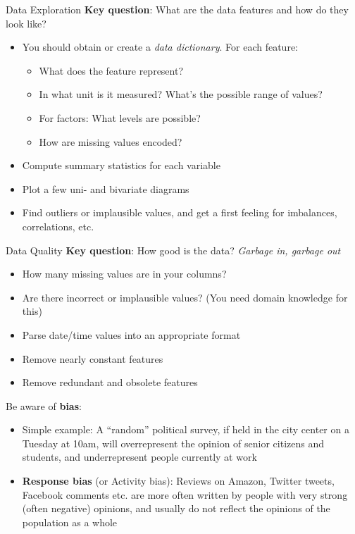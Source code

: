 \documentclass[ignorenonframetext,]{beamer}
\providecommand{\tightlist}{%
  \setlength{\itemsep}{0pt}\setlength{\parskip}{0pt}}
\begin{document}
\begin{frame}{Data Exploration}
\label{data-exploration}
\textbf{Key question}: What are the data features and how do they look like?
\begin{itemize}
\tightlist
\item
  You should obtain or create a \emph{data dictionary}. For each
  feature:

  \begin{itemize}
  \tightlist
  \item
    What does the feature represent?
  \item
    In what unit is it measured? What's the possible range of values?
  \item
    For factors: What levels are possible?
  \item
    How are missing values encoded?
  \end{itemize}
\item
  Compute summary statistics for each variable
\item
  Plot a few uni- and bivariate diagrams
\item
  Find outliers or implausible values, and get a first
  feeling for imbalances, correlations, etc.
\end{itemize}
\end{frame}

\begin{frame}{Data Quality}
\label{data-quality}
\textbf{Key question}: How good is the data? \emph{Garbage in, garbage out}
\begin{itemize}
\tightlist
\item
  How many missing values are in your columns?
\item
  Are there incorrect or implausible values? (You need domain knowledge
  for this)
\item
  Parse date/time values into an appropriate format
\item
  Remove nearly constant features
\item
  Remove redundant and obsolete features
\end{itemize}

Be aware of \textbf{bias}:

\begin{itemize}
\tightlist
\item
  Simple example: A ``random'' political survey, if held in the city
  center on a Tuesday at 10am, will overrepresent the opinion of senior
  citizens and students, and underrepresent people currently at work
\item
  \textbf{Response bias} (or Activity bias): Reviews on Amazon, Twitter
  tweets, Facebook comments etc. are more often written by people with
  very strong (often negative) opinions, and usually do not reflect the
  opinions of the population as a whole
\end{itemize}

\end{frame}
\end{document}
